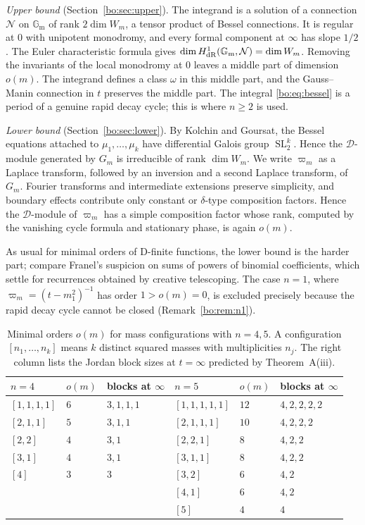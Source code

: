 \documentclass[11pt,a4paper]{article}
\theoremstyle{definition}
\theoremstyle{remark}
\numberwithin{equation}{section}
\DeclareMathOperator{\SL}{SL}
\newcommand{\Gm}{\mathbb{G}_{\mathrm{m}}}
\newcommand{\cD}{\mathcal{D}}
\newcommand{\cN}{\mathcal{N}}
\begin{document}
\emph{Upper bound} (Section~\ref{bo:sec:upper}). The integrand is a solution of a connection $\cN$ on $\Gm$ of rank $2\dim W_m$, a tensor product of Bessel connections. It is regular at $0$ with unipotent monodromy, and every formal component at $\infty$ has slope $1/2$. The Euler characteristic formula gives $\dim H^1_{\rm dR}(\Gm,\cN)=\dim W_m$. Removing the invariants of the local monodromy at $0$ leaves a middle part of dimension $o(m)$. The integrand defines a class $\omega$ in this middle part, and the Gauss--Manin connection in $t$ preserves the middle part. The integral \eqref{bo:eq:bessel} is a period of a genuine rapid decay cycle; this is where $n\ge2$ is used.

\emph{Lower bound} (Section~\ref{bo:sec:lower}). By Kolchin and Goursat, the Bessel equations attached to $\mu_1,\dots,\mu_k$ have differential Galois group $\SL_2^k$. Hence the $\cD$-module generated by $G_m$ is irreducible of rank $\dim W_m$. We write $\varpi_m$ as a Laplace transform, followed by an inversion and a second Laplace transform, of $G_m$. Fourier transforms and intermediate extensions preserve simplicity, and boundary effects contribute only constant or $\delta$-type composition factors. Hence the $\cD$-module of $\varpi_m$ has a simple composition factor whose rank, computed by the vanishing cycle formula and stationary phase, is again $o(m)$.

As usual for minimal orders of D-finite functions, the lower bound is the harder part; compare Franel's suspicion on sums of powers of binomial coefficients, which \cite{SZ23} settle for recurrences obtained by creative telescoping. The case $n=1$, where $\varpi_m=(t-m_1^2)^{-1}$ has order $1>o(m)=0$, is excluded precisely because the rapid decay cycle cannot be closed (Remark~\ref{bo:rem:n1}).

\begin{table}[ht]
\centering
\caption{Minimal orders $o(m)$ for mass configurations with $n=4,5$. A configuration $[n_1,\dots,n_k]$ means $k$ distinct squared masses with multiplicities $n_j$. The right column lists the Jordan block sizes at $t=\infty$ predicted by Theorem~A(iii).}\label{bo:tab:conf}
\begin{tabular}{@{}lll@{\qquad}lll@{}}
\toprule
$n=4$ & $o(m)$ & blocks at $\infty$ & $n=5$ & $o(m)$ & blocks at $\infty$\\
\midrule
$[1,1,1,1]$ & $6$ & $3,1,1,1$ & $[1,1,1,1,1]$ & $12$ & $4,2,2,2,2$\\
$[2,1,1]$ & $5$ & $3,1,1$ & $[2,1,1,1]$ & $10$ & $4,2,2,2$\\
$[2,2]$ & $4$ & $3,1$ & $[2,2,1]$ & $8$ & $4,2,2$\\
$[3,1]$ & $4$ & $3,1$ & $[3,1,1]$ & $8$ & $4,2,2$\\
$[4]$ & $3$ & $3$ & $[3,2]$ & $6$ & $4,2$\\
 & & & $[4,1]$ & $6$ & $4,2$\\
 & & & $[5]$ & $4$ & $4$\\
\bottomrule
\end{tabular}
\end{table}
\end{document}
